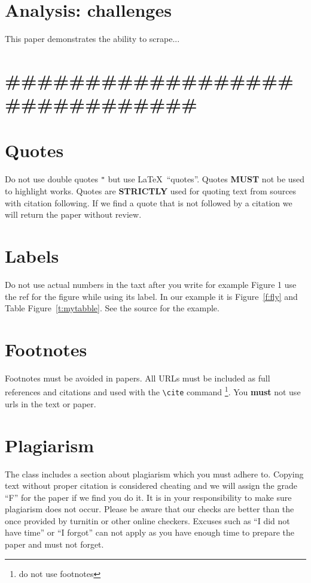 \section{Analysis: challenges}

This paper demonstrates the ability to scrape...

\section{##############################}

\section{Quotes}

Do not use double quotes \verb|"| but use \LaTeX\ ``quotes''. Quotes
{\bf MUST} not be used to highlight works. Quotes are {\bf STRICTLY}
used for quoting text from sources with citation following. If we find
a quote that is not followed by a citation we will return the paper
without review.

\section{Labels}

Do not use actual numbers in the taxt after you write for example
Figure 1 use the ref for the figure while using its label. In our
example it is Figure~\ref{f:fly} and Table Figure~\ref{t:mytabble}.
See the source for the example.

\section{Footnotes}

Footnotes must be avoided in papers. All URLs must be included as full
references and citations and used with the \verb|\cite| command
\footnote{do not use footnotes}. You {\bf must} not use urls in the
text or paper.

\section{Plagiarism}

The class includes a section about plagiarism which you must adhere
to. Copying text without proper citation is considered cheating and we
will assign the grade ``F'' for the paper if we find you do it. It is
in your responsibility to make sure plagiarism does not occur. Please
be aware that our checks are better than the once provided by turnitin
or other online checkers. Excuses such as ``I did not have time'' or
``I forgot'' can not apply as you have enough time to prepare the
paper and must not forget. 


